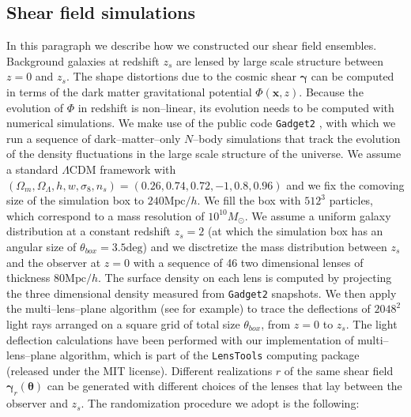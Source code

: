 \documentclass[reprint,aps,prd,superscriptaddress,showkeys,showpacs]{revtex4-1}
\newcommand{\bb}[1]{\mathbf{#1}}
\begin{document}
\subsection{Shear field simulations}
\label{shearsim}
%
In this paragraph we describe how we constructed our shear field ensembles. Background galaxies at redshift $z_s$ are lensed by large scale structure between $z=0$ and $z_s$. The shape distortions due to the cosmic shear $\pmb{\gamma}$ can be computed in terms of the dark matter gravitational potential $\Phi(\bb{x},z)$. Because the evolution of $\Phi$ in redshift is non--linear, its evolution needs to be computed with numerical simulations. We make use of the public code \texttt{Gadget2} \citep{Gadget2}, with which we run a sequence of dark--matter--only $N$--body simulations that track the evolution of the density fluctuations in the large scale structure of the universe. We assume a standard $\Lambda$CDM framework with $(\Omega_m,\Omega_\Lambda,h,w,\sigma_8,n_s)=(0.26,0.74,0.72,-1,0.8,0.96)$ and we fix the comoving size of the simulation box to $240\mathrm{Mpc}/h$. We fill the box with $512^3$ particles, which correspond to a mass resolution of $10^{10}M_\odot$. We assume a uniform galaxy distribution at a constant redshift $z_s=2$ (at which the simulation box has an angular size of $\theta_{box}=3.5\mathrm{deg}$) and we disctretize the mass distribution between $z_s$ and the observer at $z=0$ with a sequence of 46 two dimensional lenses of thickness $80\mathrm{Mpc}/h$. The surface density on each lens is computed by projecting the three dimensional density measured from \texttt{Gadget2} snapshots. We then apply the multi--lens--plane algorithm (see \citep{RayTracingHartlap,RayTracingJain} for example) to trace the deflections of $2048^2$ light rays arranged on a square grid of total size $\theta_{box}$, from $z=0$ to $z_s$. The light deflection calculations have been performed with our implementation of multi--lens--plane algorithm, which is part of the \texttt{LensTools} computing package \citep{LensTools} (released under the MIT license). Different realizations $r$ of the same shear field $\pmb{\gamma}_r(\pmb{\theta})$ can be generated with different choices of the lenses that lay between the observer and $z_s$. The randomization procedure we adopt is the following:
\end{document}
